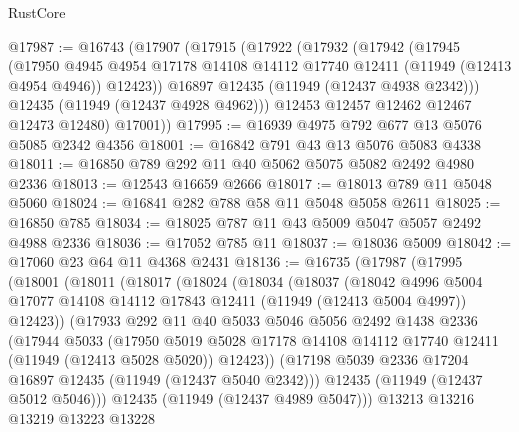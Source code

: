 \begin{lexlean}{RustCore}
\begin{coremodule}
@17987 := @16743
    (@17907
      (@17915
        (@17922
          (@17932
            (@17942
              (@17945
                (@17950
                  @4945
                  @4954
                  @17178
                  @14108
                  @14112
                  @17740
                  @12411
                  (@11949 (@12413 @4954 @4946))
                  @12423))
              @16897
              @12435
              (@11949 (@12437 @4938 @2342)))
            @12435
            (@11949 (@12437 @4928 @4962)))
          @12453
          @12457
          @12462
          @12467
          @12473
          @12480)
        @17001))
@17995 := @16939 @4975 @792 @677 @13 @5076 @5085 @2342 @4356
@18001 := @16842 @791 @43 @13 @5076 @5083 @4338
@18011 := @16850 @789 @292 @11 @40 @5062 @5075 @5082 @2492 @4980 @2336
@18013 := @12543 @16659 @2666
@18017 := @18013 @789 @11 @5048 @5060
@18024 := @16841 @282 @788 @58 @11 @5048 @5058 @2611
@18025 := @16850 @785
@18034 := @18025 @787 @11 @43 @5009 @5047 @5057 @2492 @4988 @2336
@18036 := @17052 @785 @11
@18037 := @18036 @5009
@18042 := @17060 @23 @64 @11 @4368 @2431
@18136 := @16735
    (@17987
      (@17995
        (@18001
          (@18011
            (@18017
              (@18024
                (@18034
                  (@18037
                    (@18042
                      @4996
                      @5004
                      @17077
                      @14108
                      @14112
                      @17843
                      @12411
                      (@11949 (@12413 @5004 @4997))
                      @12423))
                  (@17933
                    @292
                    @11
                    @40
                    @5033
                    @5046
                    @5056
                    @2492
                    @1438
                    @2336
                    (@17944
                      @5033
                      (@17950
                        @5019
                        @5028
                        @17178
                        @14108
                        @14112
                        @17740
                        @12411
                        (@11949 (@12413 @5028 @5020))
                        @12423))
                    (@17198 @5039 @2336 @17204 @16897 @12435 (@11949 (@12437 @5040 @2342)))
                    @12435
                    (@11949 (@12437 @5012 @5046)))
                  @12435
                  (@11949 (@12437 @4989 @5047)))
                @13213
                @13216
                @13219
                @13223
                @13228

\end{coremodule}
\end{lexlean}
